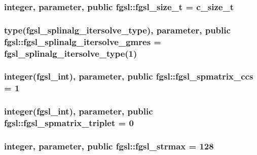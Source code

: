 \subsubsection[{fgsl\+\_\+size\+\_\+t}]{\setlength{\rightskip}{0pt plus 5cm}integer, parameter, public fgsl\+::fgsl\+\_\+size\+\_\+t = c\+\_\+size\+\_\+t}\label{namespacefgsl_a82c8fc2281b4c13609c41ae8b7f1cb1e}
\hypertarget{namespacefgsl_aaba217bc420e45e1706c82a957de5e7c}{}
\subsubsection[{fgsl\+\_\+splinalg\+\_\+itersolve\+\_\+gmres}]{\setlength{\rightskip}{0pt plus 5cm}type({\bf fgsl\+\_\+splinalg\+\_\+itersolve\+\_\+type}), parameter, public fgsl\+::fgsl\+\_\+splinalg\+\_\+itersolve\+\_\+gmres = {\bf fgsl\+\_\+splinalg\+\_\+itersolve\+\_\+type}(1)}\label{namespacefgsl_aaba217bc420e45e1706c82a957de5e7c}
\hypertarget{namespacefgsl_a9df148463077417441f15cbe0a523a2e}{}
\subsubsection[{fgsl\+\_\+spmatrix\+\_\+ccs}]{\setlength{\rightskip}{0pt plus 5cm}integer({\bf fgsl\+\_\+int}), parameter, public fgsl\+::fgsl\+\_\+spmatrix\+\_\+ccs = 1}\label{namespacefgsl_a9df148463077417441f15cbe0a523a2e}
\hypertarget{namespacefgsl_ad1d59263ef6dcca33e1e5408bd60e2dd}{}
\subsubsection[{fgsl\+\_\+spmatrix\+\_\+triplet}]{\setlength{\rightskip}{0pt plus 5cm}integer({\bf fgsl\+\_\+int}), parameter, public fgsl\+::fgsl\+\_\+spmatrix\+\_\+triplet = 0}\label{namespacefgsl_ad1d59263ef6dcca33e1e5408bd60e2dd}
\hypertarget{namespacefgsl_a1951faf9d6c8119266db0e5eee1865b7}{}
\subsubsection[{fgsl\+\_\+strmax}]{\setlength{\rightskip}{0pt plus 5cm}integer, parameter, public fgsl\+::fgsl\+\_\+strmax = 128}\label{namespacefgsl_a1951faf9d6c8119266db0e5eee1865b7}
\hypertarget{namespacefgsl_a5637d95a4aceec9a80a9b74a2e40ebdf}{}
